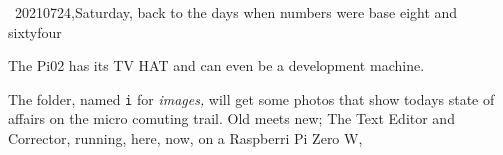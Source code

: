\ 20210724,Saturday, back to the days when numbers were base eight and sixtyfour

The Pi02 has its TV HAT and can even be a development machine. %

The folder, named {\tt i} for {\it images,} will get some photos that show todays
state of affairs on the micro comuting trail.  Old meets new; The Text Editor and
Corrector, running, here, now, on a Raspberri Pi Zero W, %

\bye
